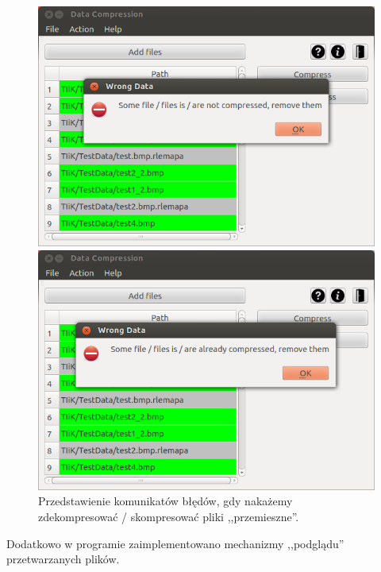 \documentclass[12pt,a4paper,notitlepage]{report}
\begin{document}
\begin{figure}[H]
	\caption{Przedstawienie komunikatów błędów, gdy nakażemy zdekompresować / skompresować pliki ,,przemieszne''.}
	\centering
	\begin{minipage}{0.45\textwidth}
		\centering
		\includegraphics[scale=.4]{error1}
	\end{minipage}\hfill
	\begin{minipage}{0.45\textwidth}
		\centering
		\includegraphics[scale=.4]{error2}
	\end{minipage}
\end{figure}
\vspace{1cm}
Dodatkowo w programie zaimplementowano mechanizmy ,,podglądu'' przetwarzanych plików.
\end{document}
